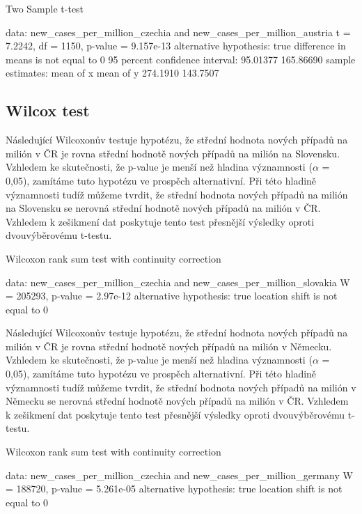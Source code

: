 \documentclass[a4paper, 12pt]{article}
\begin{document}
\begin{Schunk}
\begin{Soutput}
	Two Sample t-test

data:  new_cases_per_million_czechia and new_cases_per_million_austria
t = 7.2242, df = 1150, p-value = 9.157e-13
alternative hypothesis: true difference in means is not equal to 0
95 percent confidence interval:
  95.01377 165.86690
sample estimates:
mean of x mean of y 
 274.1910  143.7507 
\end{Soutput}
\end{Schunk}

\subsection{Wilcox test}

Následující Wilcoxonův testuje hypotézu, že střední hodnota nových případů na milión
v ČR je rovna střední hodnotě nových případů na milión na Slovensku. Vzhledem ke skutečnosti, že p-value je menší
než hladina významnosti ($\alpha$ = 0,05), zamítáme tuto hypotézu ve prospěch alternativní.
Při této hladině významnosti tudíž můžeme tvrdit, že střední hodnota nových případů na milión na Slovensku
se nerovná střední hodnotě nových případů na milión v ČR. Vzhledem k zešikmení dat poskytuje tento test přesnější
výsledky oproti dvouvýběrovému t-testu.

\begin{Schunk}
\begin{Soutput}
	Wilcoxon rank sum test with continuity correction

data:  new_cases_per_million_czechia and new_cases_per_million_slovakia
W = 205293, p-value = 2.97e-12
alternative hypothesis: true location shift is not equal to 0
\end{Soutput}
\end{Schunk}

Následující Wilcoxonův testuje hypotézu, že střední hodnota nových případů na milión
v ČR je rovna střední hodnotě nových případů na milión v Německu. Vzhledem ke skutečnosti, že p-value je menší
než hladina významnosti ($\alpha$ = 0,05), zamítáme tuto hypotézu ve prospěch alternativní.
Při této hladině významnosti tudíž můžeme tvrdit, že střední hodnota nových případů na milión v Německu
se nerovná střední hodnotě nových případů na milión v ČR. Vzhledem k zešikmení dat poskytuje tento test přesnější
výsledky oproti dvouvýběrovému t-testu.

\begin{Schunk}
\begin{Soutput}
	Wilcoxon rank sum test with continuity correction

data:  new_cases_per_million_czechia and new_cases_per_million_germany
W = 188720, p-value = 5.261e-05
alternative hypothesis: true location shift is not equal to 0
\end{Soutput}
\end{Schunk}
\end{document}
